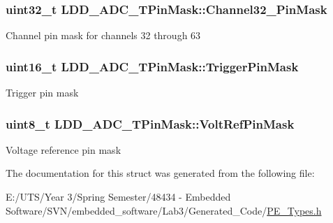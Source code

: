 \subsubsection[{Channel32\+\_\+63\+Pin\+Mask}]{\setlength{\rightskip}{0pt plus 5cm}uint32\+\_\+t L\+D\+D\+\_\+\+A\+D\+C\+\_\+\+T\+Pin\+Mask\+::\+Channel32\+\_\+Pin\+Mask}\label{struct_l_d_d___a_d_c___t_pin_mask_acd6bf6f512fb6e8cd170188dc663a4d8}
Channel pin mask for channels 32 through 63 \hypertarget{struct_l_d_d___a_d_c___t_pin_mask_a004a4d3a4f4071684e6676f64322215f}{}
\subsubsection[{Trigger\+Pin\+Mask}]{\setlength{\rightskip}{0pt plus 5cm}uint16\+\_\+t L\+D\+D\+\_\+\+A\+D\+C\+\_\+\+T\+Pin\+Mask\+::\+Trigger\+Pin\+Mask}\label{struct_l_d_d___a_d_c___t_pin_mask_a004a4d3a4f4071684e6676f64322215f}
Trigger pin mask \hypertarget{struct_l_d_d___a_d_c___t_pin_mask_a556430a91304e7db634bda25091b892c}{}
\subsubsection[{Volt\+Ref\+Pin\+Mask}]{\setlength{\rightskip}{0pt plus 5cm}uint8\+\_\+t L\+D\+D\+\_\+\+A\+D\+C\+\_\+\+T\+Pin\+Mask\+::\+Volt\+Ref\+Pin\+Mask}\label{struct_l_d_d___a_d_c___t_pin_mask_a556430a91304e7db634bda25091b892c}
Voltage reference pin mask 

The documentation for this struct was generated from the following file\+:\begin{DoxyCompactItemize}
\item 
E\+:/\+U\+T\+S/\+Year 3/\+Spring Semester/48434 -\/ Embedded Software/\+S\+V\+N/embedded\+\_\+software/\+Lab3/\+Generated\+\_\+\+Code/\hyperlink{_p_e___types_8h}{P\+E\+\_\+\+Types.\+h}\end{DoxyCompactItemize}
